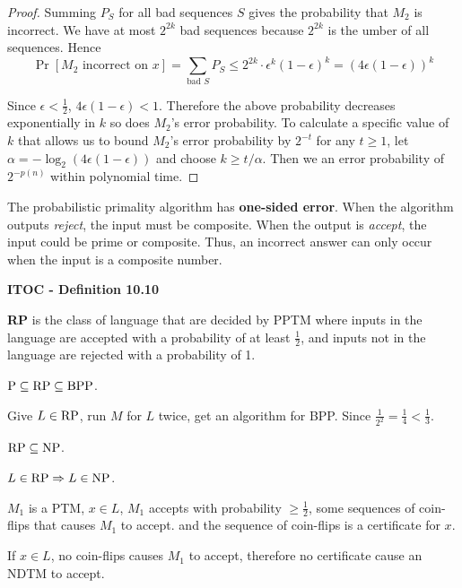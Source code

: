 \begin{mdframed}
\begin{proof}
Summing $P_S$ for all bad sequences $S$ gives the probability that $M_2$ is incorrect. We have at most $2^{2k}$ bad sequences because $2^{2k}$ is the umber of all sequences. Hence 
\[
\Pr[M_2 \text{ incorrect on } x] = \sum_{\text{bad } S}P_S \leq 2^{2k} \cdot \epsilon^k (1- \epsilon)^k = (4\epsilon (1 - \epsilon))^k
\]

Since $\epsilon < \frac{1}{2}$, $4\epsilon(1-\epsilon) < 1$. Therefore the above probability decreases exponentially in $k$ so does $M_2$'s error probability. To calculate a specific value of $k$ that allows us to bound $M_2$'s error probability by $2^{-t}$ for any $t \geq 1$, let $\alpha = -\log_2(4\epsilon(1-\epsilon))$ and choose $k \geq t/\alpha$. Then we an error probability of $2^{-p(n)}$ within polynomial time.
\end{proof}
\end{mdframed}

The probabilistic primality algorithm has \textbf{one-sided error}. When the algorithm outputs \textit{reject}, the input must be composite. When the output is \textit{accept}, the input could be prime or composite. Thus, an incorrect answer can only occur when the input is a composite number.

\begin{shaded}
\textbf{ITOC - Definition 10.10}

\textbf{RP} is the class of language that are decided by PPTM where inputs in the language are accepted with a probability of at least $\frac{1}{2}$, and inputs not in the language are rejected with a probability of 1.
\end{shaded}

$\text{P} \subseteq \text{RP} \subseteq \text{BPP}$.

\begin{mdframed}
Give $L\in \text{RP}$, run $M$ for $L$ twice, get an algorithm for BPP. Since $\frac{1}{2^2} = \frac{1}{4} <\frac{1}{3}$.
\end{mdframed}

$\text{RP} \subseteq \text{NP}$.

$L \in \text{RP} \Rightarrow L \in \text{NP}$.
\begin{mdframed}
$M_1$ is a PTM, $x \in L$, $M_1$ accepts with probability $\geq \frac{1}{2}$, some sequences of coin-flips that causes $M_1$ to accept. and the sequence of coin-flips is a certificate for $x$.

If $x\in L$, no coin-flips causes $M_1$ to accept, therefore no certificate cause an NDTM to accept.
\end{mdframed}

